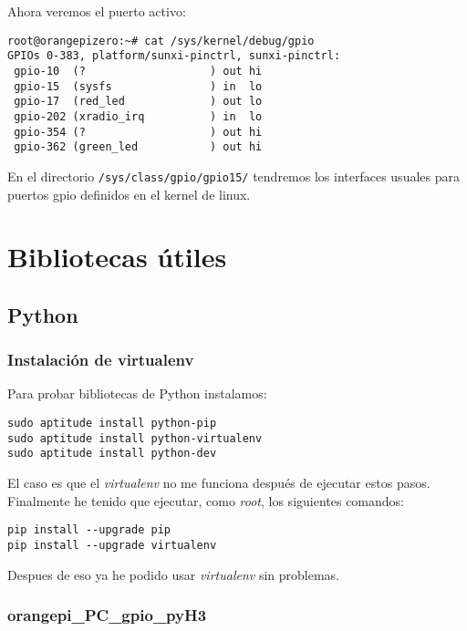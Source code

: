 \documentclass[12pt,spanish,]{scrartcl}
\begin{document}
Ahora veremos el puerto activo:

\begin{verbatim}
root@orangepizero:~# cat /sys/kernel/debug/gpio 
GPIOs 0-383, platform/sunxi-pinctrl, sunxi-pinctrl:
 gpio-10  (?                   ) out hi
 gpio-15  (sysfs               ) in  lo
 gpio-17  (red_led             ) out lo
 gpio-202 (xradio_irq          ) in  lo
 gpio-354 (?                   ) out hi
 gpio-362 (green_led           ) out hi
\end{verbatim}

En el directorio \texttt{/sys/class/gpio/gpio15/} tendremos los
interfaces usuales para puertos gpio definidos en el kernel de linux.

\hypertarget{bibliotecas-uxfatiles}{%
\section{Bibliotecas útiles}\label{bibliotecas-uxfatiles}}

\hypertarget{python}{%
\subsection{Python}\label{python}}

\hypertarget{instalaciuxf3n-de-virtualenv}{%
\subsubsection{Instalación de
virtualenv}\label{instalaciuxf3n-de-virtualenv}}

Para probar bibliotecas de Python instalamos:

\begin{verbatim}
sudo aptitude install python-pip
sudo aptitude install python-virtualenv
sudo aptitude install python-dev
\end{verbatim}

El caso es que el \emph{virtualenv} no me funciona después de ejecutar
estos pasos. Finalmente he tenido que ejecutar, como \emph{root}, los
siguientes comandos:

\begin{verbatim}
pip install --upgrade pip
pip install --upgrade virtualenv
\end{verbatim}

Despues de eso ya he podido usar \emph{virtualenv} sin problemas.

\hypertarget{orangepi_pc_gpio_pyh3}{%
\subsubsection{orangepi\_PC\_gpio\_pyH3}\label{orangepi_pc_gpio_pyh3}}
\end{document}
